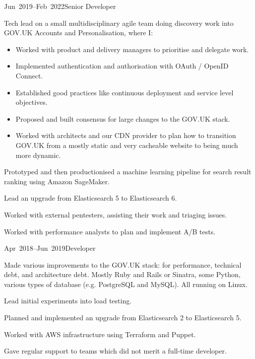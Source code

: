 \documentclass[a4paper]{barrucadu-cv}
\newcommand{\range}[2]{#1–#2}
\begin{document}
\begin{cventry}{\range{Jun~2019}{Feb~2022}}{Senior Developer}
  \begin{tightitemize}
  \item Tech lead on a small multidisciplinary agile team doing discovery work into GOV.UK Accounts and Personalisation, where I:

    \begin{itemize}
    \item Worked with product and delivery managers to prioritise and delegate work.
    \item Implemented authentication and authorisation with OAuth / OpenID Connect.
    \item Established good practices like continuous deployment and service level objectives.
    \item Proposed and built consensus for large changes to the GOV.UK stack.
    \item Worked with architects and our CDN provider to plan how to transition GOV.UK from a mostly static and very cacheable website to being much more dynamic.
    \end{itemize}

  \item Prototyped and then productionised a machine learning pipeline for search result ranking using Amazon SageMaker.
  \item Lead an upgrade from Elasticsearch 5 to Elasticsearch 6.
  \item Worked with external pentesters, assisting their work and triaging issues.
  \item Worked with performance analysts to plan and implement A/B tests.
  \end{tightitemize}
\end{cventry}

\begin{cventry}{\range{Apr~2018}{Jun~2019}}{Developer}
  \begin{tightitemize}
  \item Made various improvements to the GOV.UK stack: for performance, technical debt, and architecture debt.  Mostly Ruby and Rails or Sinatra, some Python, various types of database (e.g. PostgreSQL and MySQL).  All running on Linux.
  \item Lead initial experiments into load testing.
  \item Planned and implemented an upgrade from Elasticsearch 2 to Elasticsearch 5.
  \item Worked with AWS infrastructure using Terraform and Puppet.
  \item Gave regular support to teams which did not merit a full-time developer.
  \end{tightitemize}
\end{cventry}
\end{document}
